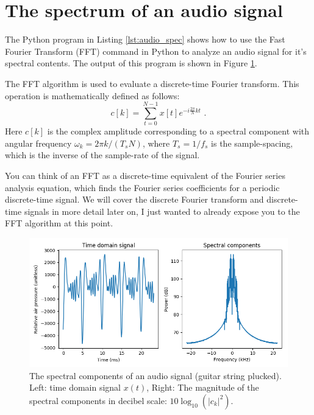 \section{The spectrum of an audio signal}

The Python program in Listing \ref{lst:audio_spec} shows how to use the Fast Fourier Transform (FFT) command in Python to analyze an audio signal for it's spectral contents. The output of this program is shown in Figure \ref{fig:audio_spec}.

The FFT algorithm is used to evaluate a discrete-time Fourier transform. This operation is mathematically defined as follows:
\begin{equation}
c[k] = \sum_{t=0}^{N-1} x[t] e^{-i\frac{2\pi}{N}kt} \,\,.
\end{equation}
Here $c[k]$ is the complex amplitude corresponding to a spectral component with angular frequency $\omega_k = 2\pi k/(T_s N)$, where $T_s=1/f_s$ is the sample-spacing, which is the inverse of the sample-rate of the signal.

You can think of an FFT as a discrete-time equivalent of the Fourier series analysis equation, which finds the Fourier series coefficients for a periodic discrete-time signal. We will cover the discrete Fourier transform and discrete-time signals in more detail later on, I just wanted to already expose you to the FFT algorithm at this point.



\begin{figure}
\begin{center}
\includegraphics[width=\textwidth]{ch07/figures/audio_spec.png}
\end{center}
\caption{The spectral components of an audio signal (guitar string plucked). Left: time domain signal $x(t)$, Right: The magnitude of the spectral components in decibel scale: $10\log_{10}(|c_k|^2)$.}
\label{fig:audio_spec}
\end{figure}
